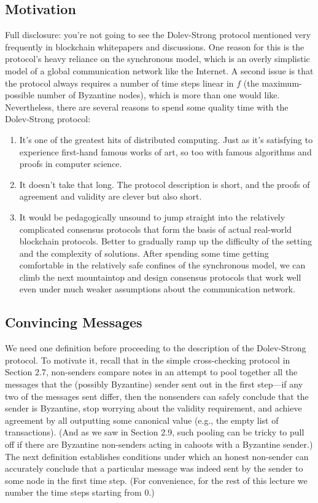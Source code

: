\subsection{Motivation}
Full disclosure: you’re not going to see the Dolev-Strong protocol mentioned very frequently
in blockchain whitepapers and discussions. One reason for this is the protocol’s heavy reliance
on the synchronous model, which is an overly simplistic model of a global communication
network like the Internet. A second issue is that the protocol always requires a number of
time steps linear in $f$ (the maximum-possible number of Byzantine nodes), which is more
than one would like.\\
Nevertheless, there are several reasons to spend some quality time with the Dolev-Strong
protocol:
\begin{enumerate}
    \item It’s one of the greatest hits of distributed computing. Just as it’s satisfying to experience first-hand famous works of art, so too with famous algorithms and proofs in
computer science.
    \item It doesn’t take that long. The protocol description is short, and the proofs of agreement
and validity are clever but also short.
    \item It would be pedagogically unsound to jump straight into the relatively complicated
consensus protocols that form the basis of actual real-world blockchain protocols. Better to gradually ramp up the difficulty of the setting and the complexity of solutions.
After spending some time getting comfortable in the relatively safe confines of the
synchronous model, we can climb the next mountaintop and design consensus protocols that work well even under much weaker assumptions about the communication
network.
\end{enumerate}

\subsection{Convincing Messages}
We need one definition before proceeding to the description of the Dolev-Strong protocol.
To motivate it, recall that in the simple cross-checking protocol in Section 2.7, non-senders
compare notes in an attempt to pool together all the messages that the (possibly Byzantine)
sender sent out in the first step—if any two of the messages sent differ, then the nonsenders can safely conclude that the sender is Byzantine, stop worrying about the validity
requirement, and achieve agreement by all outputting some canonical value (e.g., the empty
list of transactions). (And as we saw in Section 2.9, such pooling can be tricky to pull off
if there are Byzantine non-senders acting in cahoots with a Byzantine sender.) The next
definition establishes conditions under which an honest non-sender can accurately conclude
that a particular message was indeed sent by the sender to some node in the first time step.
(For convenience, for the rest of this lecture we number the time steps starting from 0.)

